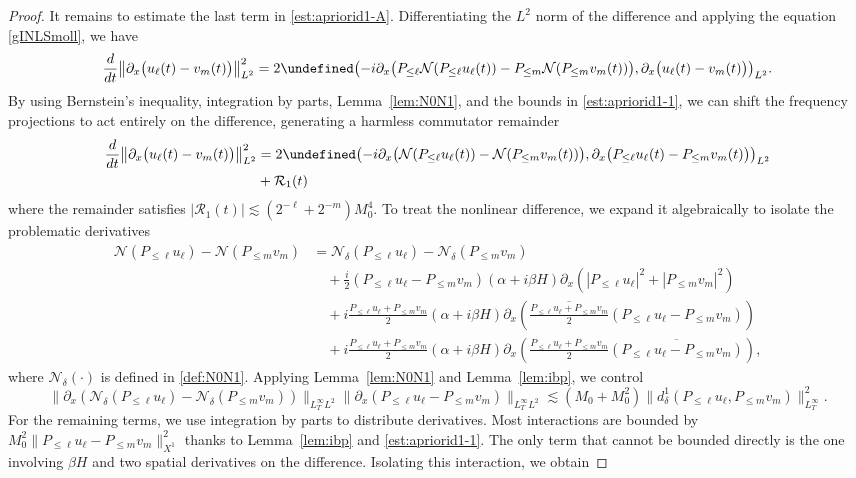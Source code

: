 \documentclass{amsart}
\numberwithin{equation}{section}
\let\Re=\undefined\DeclareMathOperator{\Re}{Re}
\begin{document}
\begin{proof}
It remains to estimate the last term in \eqref{est:apriorid1-A}. Differentiating the $L^2$ norm of the difference and applying the equation \eqref{gINLSmoll}, we have
\[
\frac{d}{dt}\big\| \partial_x\big( u_\ell(t)-v_m(t)\big) \big\|_{L^2}^2 = 2\Re \big( {-}i\partial_x\big( P_{\leq \ell}\mathcal{N}(P_{\leq \ell}u_\ell(t))-P_{\leq m}\mathcal{N}(P_{\leq m}v_m(t))\big) , \partial_x\big( u_\ell(t)-v_m(t)\big) \big)_{L^2}.
\]
By using Bernstein's inequality, integration by parts, Lemma~\ref{lem:N0N1}, and the bounds in \eqref{est:apriorid1-1}, we can shift the frequency projections to act entirely on the difference, generating a harmless commutator remainder
\begin{align*}
    \frac{d}{dt}\big\| \partial_x\big( u_\ell(t)-v_m(t)\big) \big\|_{L^2}^2 
    &= 2\Re \big( {-}i\partial_x\big( \mathcal{N}(P_{\leq \ell}u_\ell(t))-\mathcal{N}(P_{\leq m}v_m(t))\big) , \partial_x\big( P_{\leq \ell}u_\ell(t)-P_{\leq m}v_m(t)\big) \big)_{L^2} \\
    & +\mathcal{R}_1(t)
\end{align*} 
where the remainder satisfies $|\mathcal{R}_1(t)|\lesssim (2^{-\ell}+2^{-m})M_0^4$. To treat the nonlinear difference, we expand it algebraically to isolate the problematic derivatives
\begin{align*}
    \mathcal{N}(P_{\leq \ell}u_\ell)-\mathcal{N}(P_{\leq m}v_m)
    &=\mathcal{N}_\delta(P_{\leq \ell}u_\ell)-\mathcal{N}_\delta(P_{\leq m}v_m)  \\
    &\quad +\frac{i}2 (P_{\leq \ell}u_\ell-P_{\leq m}v_m) (\alpha +i\beta H)\partial_x (|P_{\leq \ell}u_\ell|^2+|P_{\leq m}v_m|^2) \\
    &\quad +i\tfrac{P_{\leq \ell}u_\ell+P_{\leq m}v_m}{2}(\alpha +i\beta H)\partial_x\left(\overline{\tfrac{P_{\leq \ell}u_\ell+P_{\leq m}v_m}{2}}(P_{\leq \ell}u_\ell-P_{\leq m}v_m)\right) \\
    &\quad+i\tfrac{P_{\leq \ell}u_\ell+P_{\leq m}v_m}{2}(\alpha +i\beta H)\partial_x \left(\tfrac{P_{\leq \ell}u_\ell+P_{\leq m}v_m}{2}\overline{(P_{\leq \ell}u_\ell-P_{\leq m}v_m)}\right) ,
\end{align*} 
where $\mathcal{N}_\delta(\cdot)$ is defined in \eqref{def:N0N1}. Applying Lemma~\ref{lem:N0N1} and Lemma~\ref{lem:ibp}, we control
\[ \| \partial_x(\mathcal{N}_\delta(P_{\leq \ell}u_\ell)-\mathcal{N}_\delta(P_{\leq m}v_m))\|_{L^\infty_TL^2}\| \partial_x(P_{\leq \ell}u_\ell-P_{\leq m}v_m)\|_{L^\infty_TL^2} \lesssim (M_0+M_0^2)\|  d^1_\delta(P_{\leq \ell}u_\ell,P_{\leq m}v_m)\|_{L^\infty_T}^2 .\]
 For the remaining terms, we use integration by parts to distribute derivatives. Most interactions are bounded by $M_0^2\| P_{\leq \ell}u_\ell-P_{\leq m}v_m\|_{X^1}^2$ thanks to Lemma~\ref{lem:ibp} and \eqref{est:apriorid1-1}. The only term that cannot be bounded directly is the one involving $\beta H$ and two spatial derivatives on the difference. Isolating this interaction, we obtain 

\end{proof}
\end{document}
